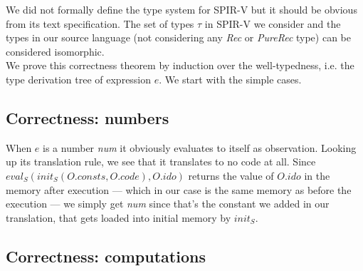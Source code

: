 \documentclass[letterpaper,12pt]{article}
\begin{document}
\begin{center}
\end{center}
\medskip

We did not formally define the type system for SPIR-V but it should
be obvious from its text specification. The set of types $\tau$ in SPIR-V
we consider and the types in our source language 
(not considering any \textit{Rec} or \textit{PureRec} type) can be considered isomorphic. \\

\medskip
We prove this correctness theorem by induction over the well-typedness, i.e. the type
derivation tree of expression $e$. We start with the simple cases.

\subsection{Correctness: numbers}

When $e$ is a number \textit{num} it obviously evaluates to itself
as observation. Looking up its translation rule, we see that it translates
to no code at all. Since $eval_S(init_S(O.consts, O.code), O.ido)$
returns the value of $O.ido$ in the memory after execution --- which
in our case is the same memory as before the execution --- we simply
get \textit{num} since that's the constant we added in our translation,
that gets loaded into initial memory by $init_S$.

\subsection{Correctness: computations}
\end{document}

